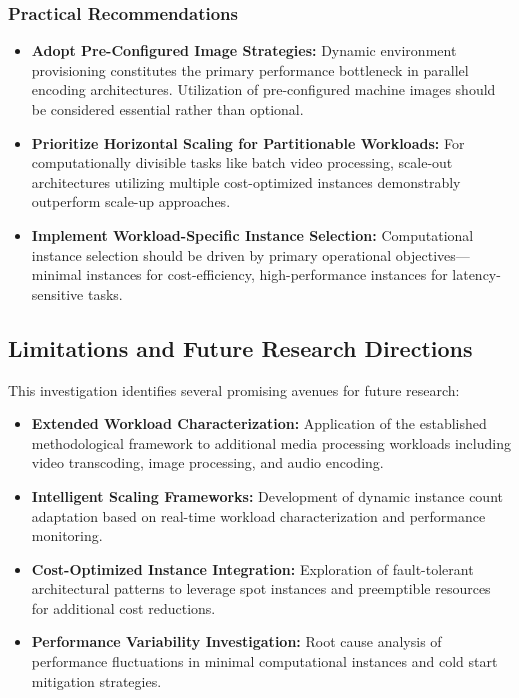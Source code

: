\documentclass[conference]{IEEEtran}
\begin{document}
	\subsubsection{Practical Recommendations}
	\begin{itemize}
		\item \textbf{Adopt Pre-Configured Image Strategies:} Dynamic environment provisioning constitutes the primary performance bottleneck in parallel encoding architectures. Utilization of pre-configured machine images should be considered essential rather than optional.
		\item \textbf{Prioritize Horizontal Scaling for Partitionable Workloads:} For computationally divisible tasks like batch video processing, scale-out architectures utilizing multiple cost-optimized instances demonstrably outperform scale-up approaches.
		\item \textbf{Implement Workload-Specific Instance Selection:} Computational instance selection should be driven by primary operational objectives—minimal instances for cost-efficiency, high-performance instances for latency-sensitive tasks.
	\end{itemize}
	
	\subsection{Limitations and Future Research Directions}
	
	This investigation identifies several promising avenues for future research:
	
	\begin{itemize}
		\item \textbf{Extended Workload Characterization:} Application of the established methodological framework to additional media processing workloads including video transcoding, image processing, and audio encoding.
		\item \textbf{Intelligent Scaling Frameworks:} Development of dynamic instance count adaptation based on real-time workload characterization and performance monitoring.
		\item \textbf{Cost-Optimized Instance Integration:} Exploration of fault-tolerant architectural patterns to leverage spot instances and preemptible resources for additional cost reductions.
		\item \textbf{Performance Variability Investigation:} Root cause analysis of performance fluctuations in minimal computational instances and cold start mitigation strategies.
	\end{itemize}
	
\end{document}
